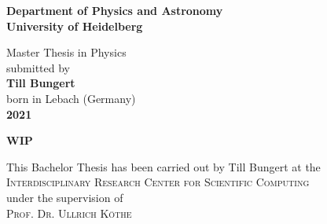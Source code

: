 \begin{titlepage}
\begin{center}
 
\Large\textbf{Department of Physics and Astronomy\\
University of Heidelberg}

\vspace{18cm}

\normalsize
Master Thesis in Physics\\
submitted by\\
\vspace{0.5cm}
\Large\textbf{Till Bungert}\\
\normalsize
\vspace{0.5cm}
born in Lebach (Germany)\\
\vspace{0.5cm}
\Large\textbf{2021}
\normalsize

\newpage

\Large\textbf{WIP}

\vspace{20cm}

\normalsize
\begin{doublespace}
This Bachelor Thesis has been carried out by Till Bungert at the\\
\textsc{Interdisciplinary Research Center for Scientific Computing}\\
under the supervision of\\
\textsc{Prof. Dr. Ullrich Köthe}
\end{doublespace}

\vfill
\end{center}

\end{titlepage}
